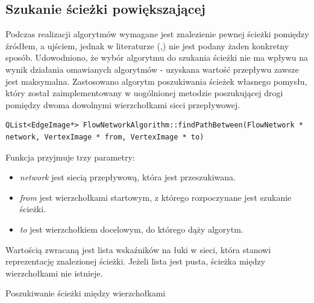\subsection{Szukanie ścieżki powiększającej}\label{ssec:szukanieSciezkiAlg}
Podczas realizacji algorytmów wymagane jest znalezienie pewnej ścieżki pomiędzy źródłem, a ujściem, jednak w literaturze (\cite{id:ZaawansowaneAlgorytmy},\cite{id:IntroductionToAlgorithms}) nie jest podany żaden konkretny sposób. Udowodniono, że wybór algorytmu do szukania ścieżki nie ma wpływu na wynik działania omawianych algorytmów - uzyskana wartość przepływu zawsze jest maksymalna. Zastosowano algorytm poszukiwania ścieżek własnego pomysłu, który został zaimplementowany w uogólnionej metodzie poszukującej drogi pomiędzy dwoma dowolnymi wierzchołkami sieci przepływowej.
\begin{verbatim}
QList<EdgeImage*> FlowNetworkAlgorithm::findPathBetween(FlowNetwork * network, VertexImage * from, VertexImage * to)
\end{verbatim}
Funkcja przyjmuje trzy parametry:
\begin{itemize}
	\item \emph{network} jest siecią przepływową, która jest przeszukiwana.
	\item \emph{from} jest wierzchołkami startowym, z którego rozpoczynane jest szukanie ścieżki.
	\item \emph{to} jest wierzchołkiem docelowym, do którego dąży algorytm.
\end{itemize}
Wartością zwracaną jest lista wskaźników na łuki w sieci, która stanowi reprezentację znalezionej ścieżki. Jeżeli lista jest pusta, ścieżka między wierzchołkami nie istnieje.
\begin{algorithm}[H]
	\caption{Poszukiwanie ścieżki między wierzchołkami}\label{poszukiwanieSciezkiMiedzyWierzcholkami}
	\begin{algorithmic}
					\EndIf
				\EndFor
					\Else
						\Else
						\EndIf
					\EndIf
				\EndIf
				\EndIf
			\EndWhile\space
		\EndProcedure
	\end{algorithmic}
\end{algorithm}

